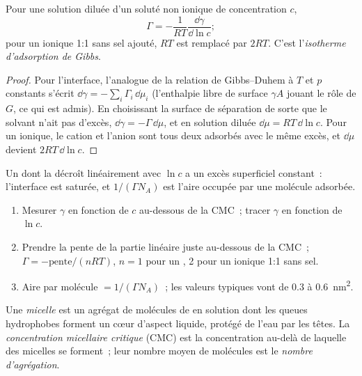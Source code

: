 \begin{theorem}\label{thm:b3:colloids:gibbs-adsorption}
Pour une solution diluée d'un soluté non ionique de concentration $c$,
\[
  \Gamma = -\frac{1}{RT}\frac{\dd\gamma}{\dd\ln c};
\]
pour un  ionique 1:1 sans sel ajouté, $RT$ est remplacé par
$2RT$. C'est
l'\emph{isotherme d'adsorption de Gibbs}.
\end{theorem}

\begin{proof}
Pour l'interface, l'analogue de la relation de Gibbs--Duhem à $T$ et
$p$ constants s'écrit $\dd\gamma = -\sum_i\Gamma_i\,\dd\mu_i$ (l'enthalpie
libre de surface $\gamma A$ jouant le rôle de $G$,
ce qui est admis). En choisissant la surface de séparation de sorte que
le solvant n'ait pas d'excès,
$\dd\gamma = -\Gamma\,\dd\mu$, et en solution diluée $\dd\mu = RT\,\dd\ln c$.
Pour un  ionique,
le cation et l'anion sont tous deux adsorbés avec le même excès, et
$\dd\mu$ devient
$2RT\,\dd\ln c$.
\end{proof}

Un  dont la  décroît linéairement avec
$\ln c$ a un excès superficiel constant~: l'interface est saturée, et
$1/(\Gamma N_A)$ est l'aire occupée par
une molécule adsorbée.

\begin{method}\label{met:b3:colloids:surface-excess}
\begin{enumerate}
  \item Mesurer $\gamma$ en fonction de $c$ au-dessous de la CMC~; tracer
        $\gamma$ en fonction de $\ln c$.
  \item Prendre la pente de la partie linéaire juste au-dessous de la
        CMC~; $\Gamma = -\text{pente}/(nRT)$, $n
        = 1$ pour un , 2 pour un 
        ionique 1:1 sans sel.
  \item Aire par molécule $= 1/(\Gamma N_A)$~; les valeurs typiques vont
        de 0.3 à \qty{0.6}{nm^2}.
\end{enumerate}
\end{method}

\begin{definition}\label{def:b3:colloids:micelle}
Une \emph{micelle} est un agrégat de molécules de
 en solution dont les queues hydrophobes forment un cœur
d'aspect liquide, protégé de l'eau par les têtes. La
\emph{concentration micellaire critique}
(CMC) est la concentration au-delà de laquelle des micelles se forment~;
leur nombre moyen de molécules est le \emph{nombre
d'agrégation}.
\end{definition}


